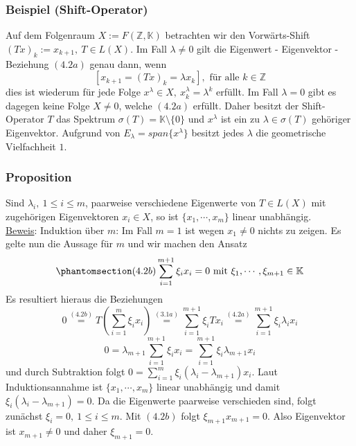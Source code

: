 \subsubsection{Beispiel (Shift-Operator)}
Auf dem Folgenraum $X:=F(\mathbb{Z},\mathbb{K})$ betrachten wir den Vorwärts-Shift $(Tx)_k :=x_{k+1},\ T\in L(X)$.  Im Fall $\lambda \not= 0$ gilt die Eigenwert - Eigenvektor - Beziehung \hyperref[4.2a]{$(4.2a)$} genau dann, wenn
\[[x_{k+1}=(Tx)_k=\lambda x_k],\text{ für alle } k\in\mathbb{Z}\]
dies ist wiederum für jede Folge $x^\lambda \in X,\ x_k^\lambda =\lambda ^k$ erfüllt.  Im Fall $\lambda = 0$ gibt es dagegen keine Folge $X\not= 0$, welche \hyperref[4.2a]{$(4.2a)$} erfüllt.  Daher besitzt der Shift-Operator $T$ das Spektrum $\sigma (T)=\mathbb{K}\setminus \{0\}$ und $x^\lambda$ ist ein zu $\lambda \in \sigma (T)$ gehöriger Eigenvektor.  Aufgrund von $E_\lambda =span\{x^\lambda\}$ besitzt jedes $\lambda$ die geometrische Vielfachheit $1$.
\subsubsection{Proposition}
Sind $\lambda _i,\ 1\leq i\leq m$, paarweise verschiedene Eigenwerte von $T\in L(X)$ mit zugehörigen Eigenvektoren $x_i\in X$, so ist $\{x_1,\cdots ,x_m\}$ linear unabhängig.\\
\underline{Beweis}: Induktion über $m$: Im Fall $m=1$ ist wegen $x_1\not=0$ nichts zu zeigen.  Es gelte nun die Aussage für $m$ und wir machen den Ansatz 
\[\phantomsection\label{4.2b}(4.2b)\sum _{i=1}^{m+1}\xi _i x_i=0\text{ mit } \xi _1,\cdots ,\xi _{m+1}\in\mathbb{K}\]
Es resultiert hieraus die Beziehungen
\[0\stackrel{\hyperref[4.2b]{(4.2b)}}{=}T(\sum _{i=1}^m \xi _i x_i)\stackrel{\hyperref[3.1a]{(3.1a)}}{=}\sum _{i=1}^{m+1}\xi _i Tx_i\stackrel{\hyperref[4.2a]{(4.2a)}}{=}\sum _{i=1}^{m+1}\xi _i\lambda _i x_i\]
\[0=\lambda _{m+1}\sum _{i=1}^{m+1}\xi _i x_i = \sum _{i=1}^{m+1} \xi _i \lambda _{m+1} x_i\]
und durch Subtraktion folgt $0=\sum _{i=1}^m \xi _i (\lambda _i-\lambda _{m+1}) x_i$.  Laut Induktionsannahme ist $\{x_1,\cdots ,x_m\}$ linear unabhängig und damit $\xi _i (\lambda _i -\lambda _{m+1})=0$.  Da die Eigenwerte paarweise verschieden sind, folgt zunächst $\xi _i=0,\ 1\leq i\leq m$.  Mit \hyperref[4.2b]{$(4.2b)$} folgt $\xi _{m+1} x_{m+1}=0$.  Also Eigenvektor ist $x_{m+1}\not=0$ und daher $\xi _{m+1}=0$.
